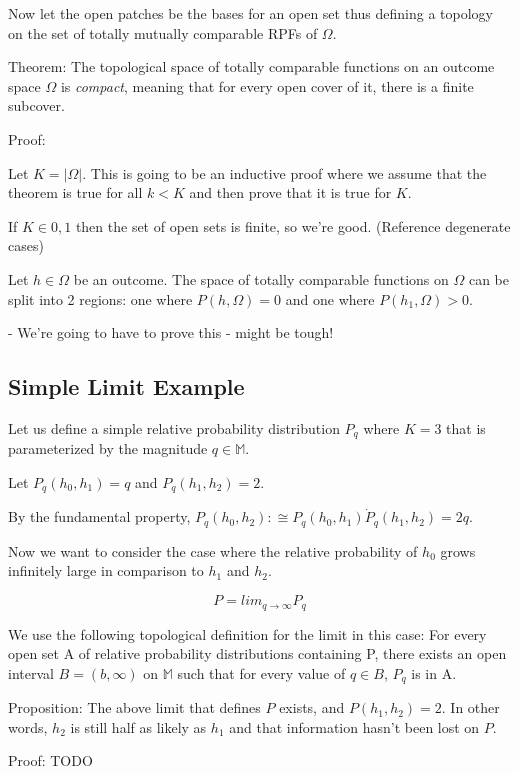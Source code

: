 \documentclass[twoside]{article}
\begin{document}
Now let the open patches be the bases for an open set thus defining a topology on the set of totally mutually comparable RPFs of \(\Omega\).

Theorem: The topological space of totally comparable functions on an outcome space \(\Omega\) is \textit{compact}, meaning that for every open cover of it, there is a finite subcover.

Proof:

Let \(K = |\Omega|\). This is going to be an inductive proof where we assume that the theorem is true for all \(k < K\) and then prove that it is true for \(K\).

If \(K \in {0, 1}\) then the set of open sets is finite, so we're good. (Reference degenerate cases)

Let \(h \in \Omega\) be an outcome. The space of totally comparable functions on \(\Omega\) can be split into 2 regions: one where \(P(h, \Omega) = 0\) and one where \(P(h_1, \Omega) > 0\).

- We're going to have to prove this - might be tough!

\subsection{Simple Limit Example}

Let us define a simple relative probability distribution \(P_q\) where \(K = 3\) that is parameterized by the magnitude \(q \in \mathbb{M}\).

Let \(P_q(h_0, h_1) = q\) and \(P_q(h_1, h_2) = 2\).

By the fundamental property, \(P_q(h_0, h_2) :\cong P_q(h_0, h_1) \dot P_q(h_1, h_2) = 2q\).

Now we want to consider the case where the relative probability of \(h_0\) grows infinitely large in comparison to \(h_1\) and \(h_2\).

\[P = lim_{q \rightarrow \infty} P_q\]

We use the following topological definition for the limit in this case: For every open set A of relative probability distributions containing P, there exists an open interval \(B=(b, \infty)\) on \(\mathbb{M}\) such that for every value of \(q \in B\), \(P_q\) is in A.

Proposition: The above limit that defines \(P\) exists, and \(P(h_1, h_2) = 2\). In other words, \(h_2\) is still half as likely as \(h_1\) and that information hasn't been lost on \(P\).

Proof: TODO
\end{document}
